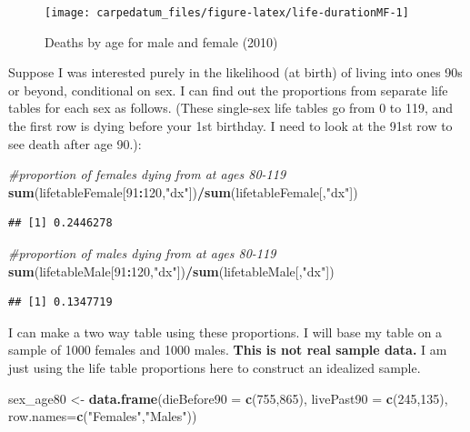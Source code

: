 \documentclass[openany]{book}
\newenvironment{Shaded}{\begin{snugshade}}{\end{snugshade}}
\newcommand{\CommentTok}[1]{\textcolor[rgb]{0.56,0.35,0.01}{\textit{#1}}}
\newcommand{\DataTypeTok}[1]{\textcolor[rgb]{0.13,0.29,0.53}{#1}}
\newcommand{\DecValTok}[1]{\textcolor[rgb]{0.00,0.00,0.81}{#1}}
\newcommand{\KeywordTok}[1]{\textcolor[rgb]{0.13,0.29,0.53}{\textbf{#1}}}
\newcommand{\NormalTok}[1]{#1}
\newcommand{\OperatorTok}[1]{\textcolor[rgb]{0.81,0.36,0.00}{\textbf{#1}}}
\newcommand{\StringTok}[1]{\textcolor[rgb]{0.31,0.60,0.02}{#1}}
\begin{document}
\begin{figure}[H]

{\centering \texttt{[image: carpedatum\_files/figure-latex/life-durationMF-1]} 

}

\caption{Deaths by age for male and female (2010)}\label{fig:life-durationMF}
\end{figure}

Suppose I was interested purely in the likelihood (at birth) of living into ones 90s or beyond, conditional on sex. I can find out the proportions from separate life tables for each sex as follows. (These single-sex life tables go from 0 to 119, and the first row is dying before your 1st birthday. I need to look at the 91st row to see death after age 90.):

\begin{Shaded}
\begin{Highlighting}[]
\CommentTok{#proportion of females dying from at ages 80-119}
\KeywordTok{sum}\NormalTok{(lifetableFemale[}\DecValTok{91}\OperatorTok{:}\DecValTok{120}\NormalTok{,}\StringTok{"dx"}\NormalTok{])}\OperatorTok{/}\KeywordTok{sum}\NormalTok{(lifetableFemale[,}\StringTok{"dx"}\NormalTok{])}
\end{Highlighting}
\end{Shaded}

\begin{verbatim}
## [1] 0.2446278
\end{verbatim}

\begin{Shaded}
\begin{Highlighting}[]
\CommentTok{#proportion of males dying from at ages 80-119}
\KeywordTok{sum}\NormalTok{(lifetableMale[}\DecValTok{91}\OperatorTok{:}\DecValTok{120}\NormalTok{,}\StringTok{"dx"}\NormalTok{])}\OperatorTok{/}\KeywordTok{sum}\NormalTok{(lifetableMale[,}\StringTok{"dx"}\NormalTok{])}
\end{Highlighting}
\end{Shaded}

\begin{verbatim}
## [1] 0.1347719
\end{verbatim}

I can make a two way table using these proportions. I will base my table on a sample of 1000 females and 1000 males. \textbf{This is not real sample data.} I am just using the life table proportions here to construct an idealized sample.

\begin{Shaded}
\begin{Highlighting}[]
\NormalTok{sex_age80 <-}\StringTok{ }\KeywordTok{data.frame}\NormalTok{(}\DataTypeTok{dieBefore90 =} \KeywordTok{c}\NormalTok{(}\DecValTok{755}\NormalTok{,}\DecValTok{865}\NormalTok{), }\DataTypeTok{livePast90 =} \KeywordTok{c}\NormalTok{(}\DecValTok{245}\NormalTok{,}\DecValTok{135}\NormalTok{), }
                        \DataTypeTok{row.names=}\KeywordTok{c}\NormalTok{(}\StringTok{"Females"}\NormalTok{,}\StringTok{"Males"}\NormalTok{))}
\end{Highlighting}
\end{Shaded}
\end{document}
